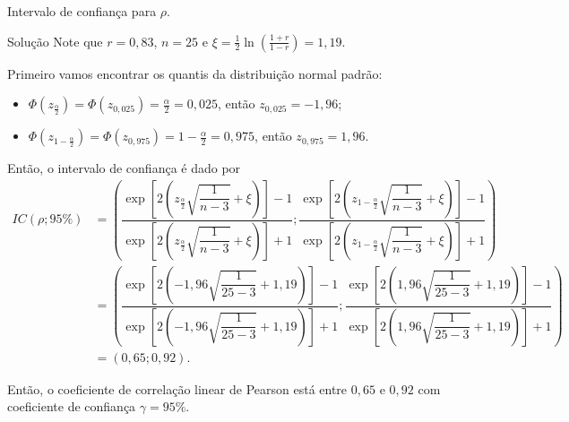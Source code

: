 \documentclass[9pt]{beamer}
\begin{document}
\begin{frame}{Intervalo de confiança para $\rho$.}

 \begin{block}{Solução}
 	Note que $r = 0,83$, $n=25$ e $\xi = \frac{1}{2} \ln\left( \frac{1+r}{1-r} \right) = 1,19$.
 	
 	Primeiro vamos encontrar os quantis da distribuição normal padrão:
 	\begin{itemize}
 		\item $\Phi\left(z_{\frac{\alpha}{2}}\right) = \Phi\left(z_{0,025}\right) = \frac{\alpha}{2} = 0,025$, então $z_{0,025} = -1,96$;
 		\item $\Phi\left(z_{1-\frac{\alpha}{2}}\right) = \Phi\left(z_{0,975}\right) = 1-\frac{\alpha}{2} = 0,975$, então $z_{0,975} = 1,96$.
 	\end{itemize}
 
 	Então, o intervalo de confiança é dado por
 	\tiny
 	\begin{align*}
 	IC(\rho; 95\%) &= \left( \dfrac{ \exp\left[ 2 \left( z_{\frac{\alpha}{2}} \sqrt{\dfrac{1}{n - 3}} + \xi \right) \right] - 1}{ \exp\left[ 2 \left( z_{\frac{\alpha}{2}} \sqrt{\dfrac{1}{n - 3}} + \xi \right) \right] + 1 }; \dfrac{ \exp\left[ 2 \left( z_{1-\frac{\alpha}{2}} \sqrt{\dfrac{1}{n - 3}} + \xi \right) \right] - 1}{ \exp\left[ 2 \left( z_{1-\frac{\alpha}{2}} \sqrt{\dfrac{1}{n - 3}} + \xi \right) \right] + 1 }  \right)\\
 	&= \left( \dfrac{ \exp\left[ 2 \left( -1,96 \sqrt{\dfrac{1}{25 - 3}} + 1,19 \right) \right] - 1}{ \exp\left[ 2 \left( -1,96 \sqrt{\dfrac{1}{25 - 3}} + 1,19 \right) \right] + 1 }; \dfrac{ \exp\left[ 2 \left( 1,96 \sqrt{\dfrac{1}{25 - 3}} + 1,19 \right) \right] - 1}{ \exp\left[ 2 \left( 1,96 \sqrt{\dfrac{1}{25 - 3}} + 1,19 \right) \right] + 1 }  \right)\\
 	& = \left(0,65; 0,92\right).
 	\end{align*}
 \end{block}
\normalsize

Então, o coeficiente de correlação linear de Pearson está entre $0,65$ e $0,92$ com coeficiente de confiança $\gamma=95\%$.
\end{frame}
\end{document}
